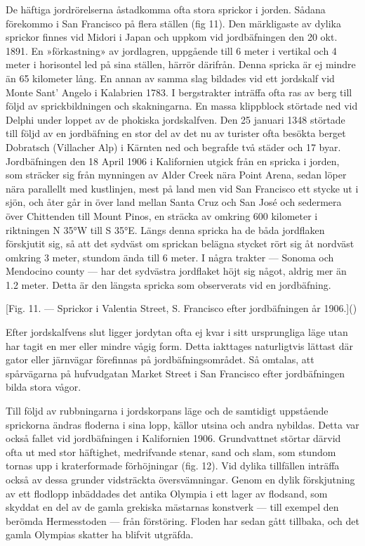 \documentclass[a4paper, 12pt, oneside, swedish]{article}
\begin{document}
De häftiga jordrörelserna åstadkomma ofta stora sprickor i jorden. Sådana förekommo i San Francisco på flera ställen (fig 11). Den märkligaste av dylika sprickor finnes vid Midori i Japan och uppkom vid jordbäfningen den 20 okt. 1891. En »förkastning» av jordlagren, uppgående till 6 meter i vertikal och 4 meter i horisontel led på sina ställen, härrör därifrån. Denna spricka är ej mindre än 65 kilometer lång. En annan av samma slag bildades vid ett jordskalf vid Monte Sant' Angelo i Kalabrien 1783. I bergstrakter inträffa ofta ras av berg till följd av sprickbildningen och skakningarna. En massa klippblock störtade ned vid Delphi under loppet av de phokiska jordskalfven. Den 25 januari 1348 störtade till följd av en jordbäfning en stor del av det nu av turister ofta besökta berget Dobratsch (Villacher Alp) i Kärnten ned och begrafde två städer och 17 byar. Jordbäfningen den 18 April 1906 i Kalifornien utgick från en spricka i jorden, som sträcker sig från mynningen av Alder Creek nära Point Arena, sedan löper nära parallellt med kustlinjen, mest på land men vid San Francisco ett stycke ut i sjön, och åter går in över land mellan Santa Cruz och San José och sedermera över Chittenden till Mount Pinos, en sträcka av omkring 600 kilometer i riktningen N 35°W till S 35°E. Längs denna spricka ha de båda jordflaken förskjutit sig, så att det sydväst om sprickan belägna stycket rört sig åt nordväst omkring 3 meter, stundom ända till 6 meter. I några trakter --- Sonoma och Mendocino county --- har det sydvästra jordflaket höjt sig något, aldrig mer än 1.2 meter. Detta är den längsta spricka som observerats vid en jordbäfning.

[Fig. 11. --- Sprickor i Valentia Street, S. Francisco efter jordbäfningen år 1906.]()

Efter jordskalfvens slut ligger jordytan ofta ej kvar i sitt ursprungliga läge utan har tagit en mer eller mindre vågig form. Detta iakttages naturligtvis lättast där gator eller järnvägar förefinnas på jordbäfningsområdet. Så omtalas, att spårvägarna på hufvudgatan Market Street i San Francisco efter jordbäfningen bilda stora vågor.

Till följd av rubbningarna i jordskorpans läge och de samtidigt uppstående sprickorna ändras floderna i sina lopp, källor utsina och andra nybildas. Detta var också fallet vid jordbäfningen i Kalifornien 1906. Grundvattnet störtar därvid ofta ut med stor häftighet, medrifvande stenar, sand och slam, som stundom tornas upp i kraterformade förhöjningar (fig. 12). Vid dylika tillfällen inträffa också av dessa grunder vidsträckta översvämningar. Genom en dylik förskjutning av ett flodlopp inbäddades det antika Olympia i ett lager av flodsand, som skyddat en del av de gamla grekiska mästarnas konstverk --- till exempel den berömda Hermesstoden --- från förstöring. Floden har sedan gått tillbaka, och det gamla Olympias skatter ha blifvit utgräfda.
\end{document}
